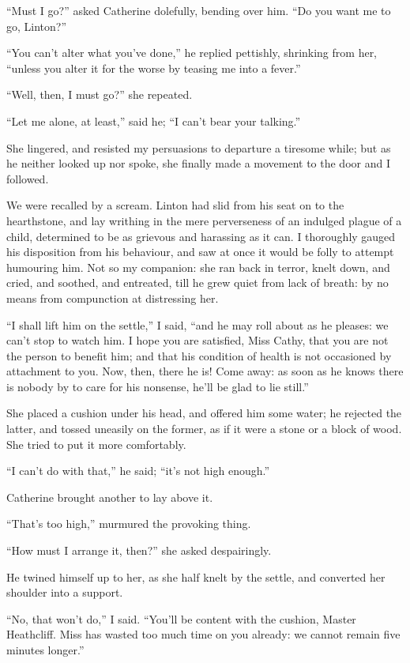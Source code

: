 \par “Must I go?” asked Catherine dolefully, bending over him. “Do you want me to go, Linton?”
\par “You can't alter what you've done,” he replied pettishly, shrinking from her, “unless you alter it for the worse by teasing me into a fever.”
\par “Well, then, I must go?” she repeated.
\par “Let me alone, at least,” said he; “I can't bear your talking.”
\par She lingered, and resisted my persuasions to departure a tiresome while; but as he neither looked up nor spoke, she finally made a movement to the door and I followed.
\par We were recalled by a scream. Linton had slid from his seat on to the hearthstone, and lay writhing in the mere perverseness of an indulged plague of a child, determined to be as grievous and harassing as it can. I thoroughly gauged his disposition from his behaviour, and saw at once it would be folly to attempt humouring him. Not so my companion: she ran back in terror, knelt down, and cried, and soothed, and entreated, till he grew quiet from lack of breath: by no means from compunction at distressing her.
\par “I shall lift him on the settle,” I said, “and he may roll about as he pleases: we can't stop to watch him. I hope you are satisfied, Miss Cathy, that you are not the person to benefit him; and that his condition of health is not occasioned by attachment to you. Now, then, there he is! Come away: as soon as he knows there is nobody by to care for his nonsense, he'll be glad to lie still.”
\par She placed a cushion under his head, and offered him some water; he rejected the latter, and tossed uneasily on the former, as if it were a stone or a block of wood. She tried to put it more comfortably.
\par “I can't do with that,” he said; “it's not high enough.”
\par Catherine brought another to lay above it.
\par “That's too high,” murmured the provoking thing.
\par “How must I arrange it, then?” she asked despairingly.
\par He twined himself up to her, as she half knelt by the settle, and converted her shoulder into a support.
\par “No, that won't do,” I said. “You'll be content with the cushion, Master Heathcliff. Miss has wasted too much time on you already: we cannot remain five minutes longer.”
